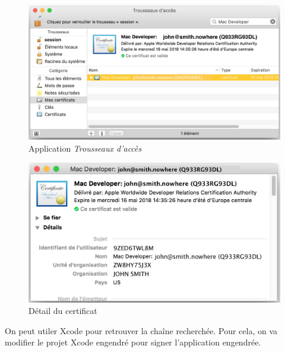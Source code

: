 \begin{figure}[!t]
  \centering
  \includegraphics[width=14cm]{chapitre-cocoa-features/trousseaux-acces.png}
  \caption{Application \emph{Trousseaux d'accès}}
  \ligne
\end{figure}




\begin{figure}[!t]
  \centering
  \includegraphics[width=14cm]{chapitre-cocoa-features/certificat.png}
  \caption{Détail du certificat}
  \ligne
\end{figure}







On peut utiler Xcode pour retrouver la chaîne recherchée. Pour cela, on va modifier le projet Xcode engendré pour signer l'application engendrée. 





